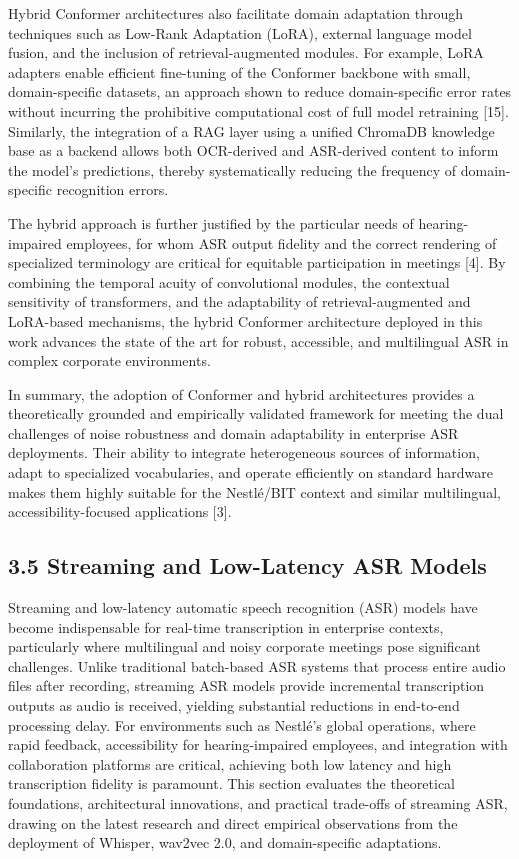 \documentclass[12pt,a4paper]{article}
\begin{document}
Hybrid Conformer architectures also facilitate domain adaptation through techniques such as Low-Rank Adaptation (LoRA), external language model fusion, and the inclusion of retrieval-augmented modules. For example, LoRA adapters enable efficient fine-tuning of the Conformer backbone with small, domain-specific datasets, an approach shown to reduce domain-specific error rates without incurring the prohibitive computational cost of full model retraining [15]. Similarly, the integration of a RAG layer using a unified ChromaDB knowledge base as a backend allows both OCR-derived and ASR-derived content to inform the model’s predictions, thereby systematically reducing the frequency of domain-specific recognition errors.


The hybrid approach is further justified by the particular needs of hearing-impaired employees, for whom ASR output fidelity and the correct rendering of specialized terminology are critical for equitable participation in meetings [4]. By combining the temporal acuity of convolutional modules, the contextual sensitivity of transformers, and the adaptability of retrieval-augmented and LoRA-based mechanisms, the hybrid Conformer architecture deployed in this work advances the state of the art for robust, accessible, and multilingual ASR in complex corporate environments.


In summary, the adoption of Conformer and hybrid architectures provides a theoretically grounded and empirically validated framework for meeting the dual challenges of noise robustness and domain adaptability in enterprise ASR deployments. Their ability to integrate heterogeneous sources of information, adapt to specialized vocabularies, and operate efficiently on standard hardware makes them highly suitable for the Nestlé/BIT context and similar multilingual, accessibility-focused applications [3].


\subsection{3.5 Streaming and Low-Latency ASR Models}


Streaming and low-latency automatic speech recognition (ASR) models have become indispensable for real-time transcription in enterprise contexts, particularly where multilingual and noisy corporate meetings pose significant challenges. Unlike traditional batch-based ASR systems that process entire audio files after recording, streaming ASR models provide incremental transcription outputs as audio is received, yielding substantial reductions in end-to-end processing delay. For environments such as Nestlé’s global operations, where rapid feedback, accessibility for hearing-impaired employees, and integration with collaboration platforms are critical, achieving both low latency and high transcription fidelity is paramount. This section evaluates the theoretical foundations, architectural innovations, and practical trade-offs of streaming ASR, drawing on the latest research and direct empirical observations from the deployment of Whisper, wav2vec 2.0, and domain-specific adaptations.
\end{document}
